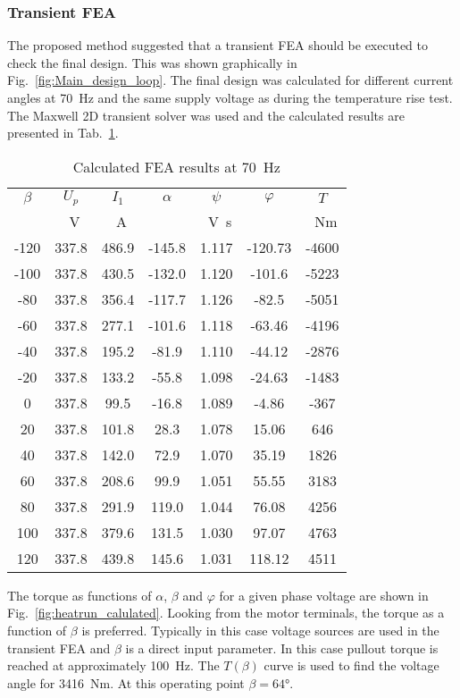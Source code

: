 \subsubsection{Transient FEA}
The proposed method suggested that a transient FEA should be executed to check the final design. This was shown graphically in Fig.~\ref{fig:Main_design_loop}. The final design was calculated for different current angles at \SI{70}{Hz} and the same supply voltage as during the temperature rise test. The Maxwell 2D transient solver was used and the calculated results are presented in Tab.~\ref{tab:FEACalculatedResults}. 
\begin{table}
	\centering
	\caption{Calculated FEA results at \SI{70}{Hz}}
		\begin{tabular}{ccccccc}
		\hline
		$\beta$  & $U_p$ &  $I_1$	 & $\alpha$  & $\psi$	& $\varphi$	& $T$ \\
		\SI{}{\arcdeg}   & 
		\SI{}{V}         & 
		\SI{}{A}         & 
		\SI{}{\arcdeg}   & 
		\SI{}{V.s}       &  
		\SI{}{\arcdeg}   & 
		\SI{}{Nm}%
		\\
		\hline
    -120	 &337.8	&486.9	&-145.8	&1.117	&-120.73	&-4600 \\
    -100	 &337.8	&430.5	&-132.0	&1.120	&-101.6	&-5223  \\
    -80	   &337.8	&356.4	&-117.7	&1.126	&-82.5	&-5051  \\
    -60	   &337.8	&277.1	&-101.6	&1.118	&-63.46	&-4196  \\
    -40	   &337.8	&195.2	&-81.9	&1.110	&-44.12	&-2876  \\
    -20	   &337.8	&133.2	&-55.8	&1.098	&-24.63	&-1483  \\
    0	     &337.8	&99.5	  &-16.8	&1.089	&-4.86	&-367   \\
    20	   &337.8	&101.8	&28.3	  &1.078	&15.06	&646 \\
    40	   &337.8	&142.0	&72.9	  &1.070	&35.19	&1826   \\
    60	   &337.8	&208.6	&99.9	  &1.051	&55.55	&3183 \\
    80	   &337.8	&291.9	&119.0	&1.044	&76.08	&4256  \\
    100	   &337.8	&379.6	&131.5	&1.030	&97.07	&4763  \\
    120	   &337.8	&439.8	&145.6	&1.031	&118.12	&4511  \\
    \hline
	\end{tabular}
	\label{tab:FEACalculatedResults}
\end{table}

The torque as functions of $\alpha$, $\beta$ and $\varphi$ for a given phase voltage are shown in Fig.~\ref{fig:heatrun_calulated}. Looking from the motor terminals, the torque as a function of $\beta$ is preferred. Typically in this case voltage sources are used in the transient FEA and $\beta$ is a direct input parameter. In this case pullout torque is reached at approximately \SI{100}{Hz}. The $T(\beta)$ curve is used to find the voltage angle for \SI{3416}{Nm}. At this operating point $\beta=\ang{64}$.

